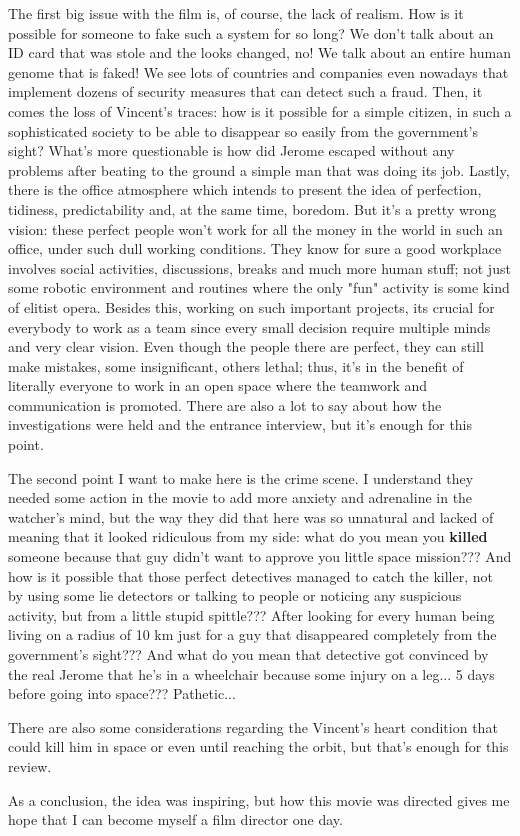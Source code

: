 \documentclass[10pt,a4paper]{article}
\begin{document}
	The first big issue with the film is, of course, the lack of realism. How is it possible for someone to fake such a system for so long? We don't talk about an ID card that was stole and the looks changed, no! We talk about an entire human genome that is faked! We see lots of countries and companies even nowadays that implement dozens of security measures that can detect such a fraud. Then, it comes the loss of Vincent's traces: how is it possible for a simple citizen, in such a sophisticated society to be able to disappear so easily from the government's sight? What's more questionable is how did Jerome escaped without any problems after beating to the ground a simple man that was doing its job. Lastly, there is the office atmosphere which intends to present the idea of perfection, tidiness, predictability and, at the same time, boredom. But it's a pretty wrong vision: these perfect people won't work for all the money in the world in such an office, under such dull working conditions. They know for sure a good workplace involves social activities, discussions, breaks and much more human stuff; not just some robotic environment and routines where the only "fun" activity is some kind of elitist opera. Besides this, working on such important projects, its crucial for everybody to work as a team since every small decision require multiple minds and very clear vision. Even though the people there are perfect, they can still make mistakes, some insignificant, others lethal; thus, it's in the benefit of literally everyone to work in an open space where the teamwork and communication is promoted. There are also a lot to say about how the investigations were held and the entrance interview, but it's enough for this point.
	
	The second point I want to make here is the crime scene. I understand they needed some action in the movie to add more anxiety and adrenaline in the watcher's mind, but the way they did that here was so unnatural and lacked of meaning that it looked ridiculous from my side: what do you mean you \textbf{killed} someone because that guy didn't want to approve you little space mission??? And how is it possible that those perfect detectives managed to catch the killer, not by using some lie detectors or talking to people or noticing any suspicious activity, but from a little stupid spittle??? After looking for every human being living on a radius of 10 km just for a guy that disappeared completely from the government's sight??? And what do you mean that detective got convinced by the real Jerome that he's in a wheelchair because some injury on a leg... 5 days before going into space??? Pathetic...
	
	There are also some considerations regarding the Vincent's heart condition that could kill him in space or even until reaching the orbit, but that's enough for this review.
	
	As a conclusion, the idea was inspiring, but how this movie was directed gives me hope that I can become myself a film director one day.
\end{document}
